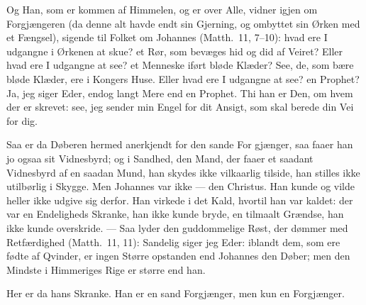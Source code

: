 \documentclass[12pt,a4paper]{book}
\begin{document}
Og Han, som er kommen af Himmelen, og er over Alle, vidner igjen om Forgjængeren
(da denne alt havde endt sin Gjerning, og ombyttet sin Ørken med et Fængsel),
sigende til Folket om Johannes (Matth.\ 11, 7--10): {\large hvad ere I udgangne i
Ørkenen at skue? et Rør, som bevæges hid og did af Veiret? Eller hvad ere I
udgangne at see? et Menneske iført bløde Klæder? See, de, som bære bløde Klæder,
ere i Kongers Huse. Eller hvad ere I udgangne at see? en Prophet? Ja, jeg siger
Eder, endog langt Mere end en Prophet. Thi han er Den, om hvem der er skrevet:
see, jeg sender min Engel for dit Ansigt, som skal berede din Vei for dig.}

Saa er da Døberen hermed anerkjendt for den sande For\-%
gjænger, saa faaer han jo ogsaa sit Vidnesbyrd; og i Sandhed, den Mand, der faaer
et saadant Vidnesbyrd af en saadan Mund, han skydes ikke vilkaarlig tilside, han
stilles ikke utilbørlig i Skygge. Men Johannes var ikke --- den Christus. Han
kunde og vilde heller ikke udgive sig derfor. Han virkede i det Kald, hvortil han
var kaldet: der var en Endeligheds Skranke, han ikke kunde bryde, en tilmaalt
Grændse, han ikke kunde overskride. --- Saa lyder den guddommelige Røst, der
dømmer med Retfærdighed (Matth.\ 11, 11): {\large Sandelig siger jeg Eder:
iblandt dem, som ere fødte af Qvinder, er ingen Større opstanden end Johannes den
Døber; men den Mindste i Himmeriges Rige er større end han.}

Her er da hans Skranke. Han er en sand Forgjænger, men kun en Forgjænger.
\end{document}
